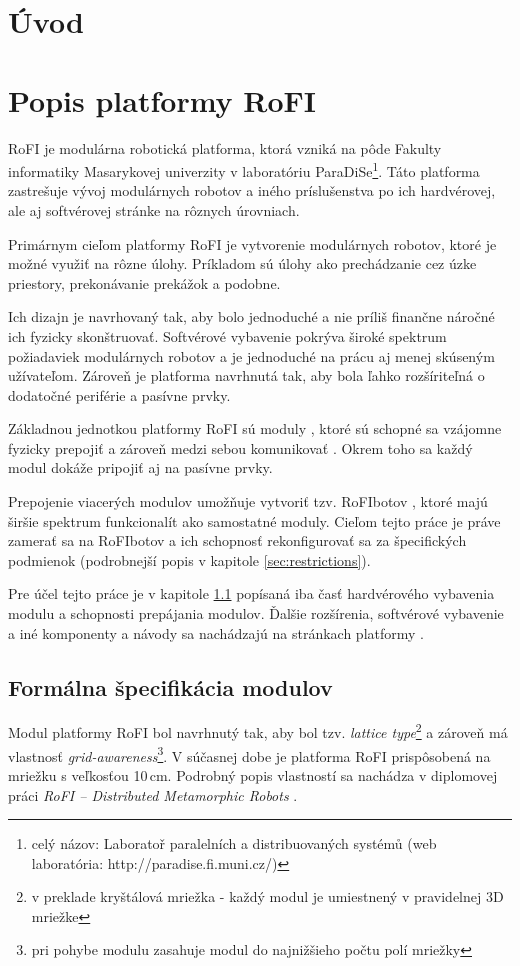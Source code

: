 \documentclass[
  digital, %
  twoside, %
  table,   %
  nolof,     %
  nolot,     %
]{fithesis3}
\begin{document}
\chapter*{Úvod}

\chapter{Popis platformy RoFI}
\label{sec:platform}
RoFI je modulárna robotická platforma, ktorá vzniká na pôde Fakulty informatiky Masarykovej univerzity v laboratóriu ParaDiSe\footnote{celý názov: Laboratoř paralelních a distribuovaných systémů (web laboratória: http://paradise.fi.muni.cz/)}. Táto platforma zastrešuje vývoj modulárnych robotov a iného príslušenstva po ich hardvérovej, ale aj softvérovej stránke na rôznych úrovniach. 

Primárnym cieľom platformy RoFI je vytvorenie modulárnych robotov, ktoré je možné využiť na rôzne úlohy. Príkladom sú úlohy ako prechádzanie cez úzke priestory, prekonávanie prekážok a podobne. 

Ich dizajn je navrhovaný tak, aby bolo jednoduché a nie príliš finančne náročné ich fyzicky skonštruovať. Softvérové vybavenie pokrýva široké spektrum požiadaviek modulárnych robotov a je jednoduché na prácu aj menej skúseným užívateľom. Zároveň je platforma navrhnutá tak, aby bola ľahko rozšíriteľná o dodatočné periférie a pasívne prvky. 

Základnou jednotkou platformy RoFI sú moduly \cite{mrazekMasterThesis}, ktoré sú schopné sa vzájomne fyzicky prepojiť a zároveň medzi sebou komunikovať \cite{rofiCom}. Okrem toho sa každý modul dokáže pripojiť aj na pasívne prvky. 

Prepojenie viacerých modulov umožňuje vytvoriť tzv. RoFIbotov \cite{rofiWeb}, ktoré majú širšie spektrum funkcionalít ako samostatné moduly. Cieľom tejto práce je práve zamerať sa na RoFIbotov a ich schopnosť rekonfigurovať sa za špecifických podmienok (podrobnejší popis v kapitole \ref{sec:restrictions}). 

Pre účel tejto práce je v kapitole \ref{sec:moduleSpec} popísaná iba časť hardvérového vybavenia modulu a schopnosti prepájania modulov. Ďalšie rozšírenia, softvérové vybavenie a iné komponenty a návody sa nachádzajú na stránkach platformy \cite{rofiWeb}. 

\section{Formálna špecifikácia modulov}
\label{sec:moduleSpec}
Modul platformy RoFI bol navrhnutý tak, aby bol tzv. \textit{lattice type}\footnote{v preklade kryštálová mriežka - každý modul je umiestnený v pravidelnej 3D mriežke} a zároveň má vlastnosť \textit{grid-awareness}\footnote{pri pohybe modulu zasahuje modul do najnižšieho počtu polí mriežky}. V súčasnej dobe je platforma RoFI prispôsobená na mriežku s veľkosťou 10\,cm. Podrobný popis vlastností sa nachádza v diplomovej práci \textit{RoFI – Distributed Metamorphic Robots} \cite{mrazekMasterThesis}. 
\end{document}
